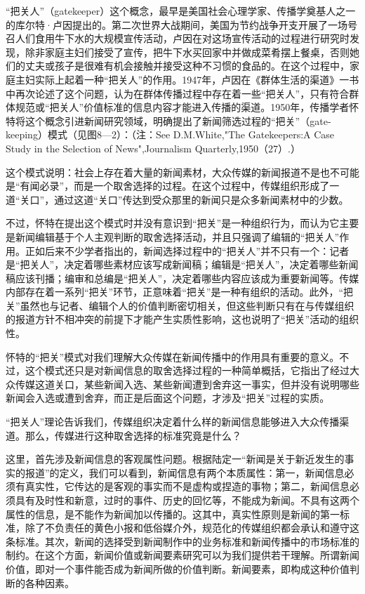 \documentclass[UTF8,12pt]{ctexart}
\numberwithin{equation}{section} %
\numberwithin{figure}{section}
\numberwithin{table}{section}
\begin{document}
	“把关人”（gatekeeper）这个概念，最早是美国社会心理学家、传播学奠基人之一的库尔特·卢因提出的。第二次世界大战期间，美国为节约战争开支开展了一场号召人们食用牛下水的大规模宣传活动，卢因在对这场宣传活动的过程进行研究时发现，除非家庭主妇们接受了宣传，把牛下水买回家中并做成菜肴摆上餐桌，否则她们的丈夫或孩子是很难有机会接触并接受这种不习惯的食品的。在这个过程中，家庭主妇实际上起着一种“把关人”的作用。1947年，卢因在《群体生活的渠道》一书中再次论述了这个问题，认为在群体传播过程中存在着一些“把关人”，只有符合群体规范或“把关人”价值标准的信息内容才能进入传播的渠道。1950年，传播学者怀特将这个概念引进新闻研究领域，明确提出了新闻筛选过程的“把关”（gate-keeping）模式（见图8—2）：（注：See D.M.White,"The Gatekeepers:A Case Study in the Selection of News",Journalism Quarterly,1950（27）.）
	
	这个模式说明：社会上存在着大量的新闻素材，大众传媒的新闻报道不是也不可能是“有闻必录”，而是一个取舍选择的过程。在这个过程中，传媒组织形成了一道“关口”，通过这道“关口”传达到受众那里的新闻只是众多新闻素材中的少数。
	
	不过，怀特在提出这个模式时并没有意识到“把关”是一种组织行为，而认为它主要是新闻编辑基于个人主观判断的取舍选择活动，并且只强调了编辑的“把关人”作用。正如后来不少学者指出的，新闻选择过程中的“把关人”并不只有一个：记者是“把关人”，决定着哪些素材应该写成新闻稿；编辑是“把关人”，决定着哪些新闻稿应该刊播；编审和总编是“把关人”，决定着哪些内容应该成为重要新闻等。传媒内部存在着一系列“把关”环节，正意味着“把关”是一种有组织的活动。此外，“把关”虽然也与记者、编辑个人的价值判断密切相关，但这些判断只有在与传媒组织的报道方针不相冲突的前提下才能产生实质性影响，这也说明了“把关”活动的组织性。
	
	怀特的“把关”模式对我们理解大众传媒在新闻传播中的作用具有重要的意义。不过，这个模式还只是对新闻信息的取舍选择过程的一种简单概括，它指出了经过大众传媒这道关口，某些新闻入选、某些新闻遭到舍弃这一事实，但并没有说明哪些新闻会入选或遭到舍弃，而正是后面这个问题，才涉及“把关”过程的实质。
	
	“把关人”理论告诉我们，传媒组织决定着什么样的新闻信息能够进入大众传播渠道。那么，传媒进行这种取舍选择的标准究竟是什么？
	
	这里，首先涉及新闻信息的客观属性问题。根据陆定一“新闻是关于新近发生的事实的报道”的定义，我们可以看到，新闻信息有两个本质属性：第一，新闻信息必须有真实性，它传达的是客观的事实而不是虚构或捏造的事物；第二，新闻信息必须具有及时性和新意，过时的事件、历史的回忆等，不能成为新闻。不具有这两个属性的信息，是不能作为新闻加以传播的。这其中，真实性原则是新闻的第一标准，除了不负责任的黄色小报和低俗媒介外，规范化的传媒组织都会承认和遵守这条标准。其次，新闻的选择受到新闻制作中的业务标准和新闻传播中的市场标准的制约。在这个方面，新闻价值或新闻要素研究可以为我们提供若干理解。所谓新闻价值，即对一个事件能否成为新闻所做的价值判断。新闻要素，即构成这种价值判断的各种因素。
	
\end{document}
